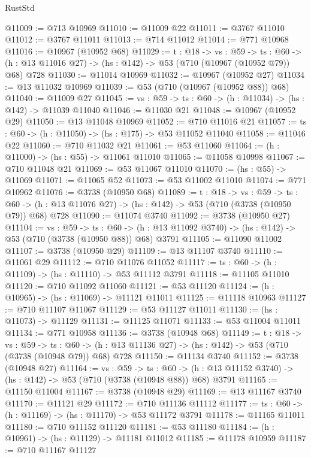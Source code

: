 \begin{lexlean}{RustStd}
\begin{coremodule}
@11009 := @713 @10969
@11010 := @11009 @22
@11011 := @3767 @11010
@11012 := @3767 @11011
@11013 := @714 @11012
@11014 := @771 @10968
@11016 := @10967 (@10952 @68)
@11029 := {t : @18} ->
  {vs : @59} ->
  {ts : @60} -> (h : @13 @11016 @27) -> (hs : @142) -> @53 (@710 (@10967 (@10952 @79)) @68) @728
@11030 := @11014 @10969
@11032 := @10967 (@10952 @27)
@11034 := @13 @11032 @10969
@11039 := @53 (@710 (@10967 (@10952 @88)) @68)
@11040 := @11009 @27
@11045 := {vs : @59} -> {ts : @60} -> (h : @11034) -> (hs : @142) -> @11039 @11040
@11046 := @11030 @21
@11048 := @10967 (@10952 @29)
@11050 := @13 @11048 @10969
@11052 := @710 @11016 @21
@11057 := {ts : @60} -> (h : @11050) -> (hs : @175) -> @53 @11052 @11040
@11058 := @11046 @22
@11060 := @710 @11032 @21
@11061 := @53 @11060
@11064 := (h : @11000) -> (hs : @55) -> @11061 @11010
@11065 := @11058 @10998
@11067 := @710 @11048 @21
@11069 := @53 @11067 @11010
@11070 := (hs : @55) -> @11069
@11071 := @11065 @52
@11073 := @53 @11002 @11010
@11074 := @771 @10962
@11076 := @3738 (@10950 @68)
@11089 := {t : @18} ->
  {vs : @59} ->
  {ts : @60} -> (h : @13 @11076 @27) -> (hs : @142) -> @53 (@710 (@3738 (@10950 @79)) @68) @728
@11090 := @11074 @3740
@11092 := @3738 (@10950 @27)
@11104 := {vs : @59} ->
  {ts : @60} -> (h : @13 @11092 @3740) -> (hs : @142) -> @53 (@710 (@3738 (@10950 @88)) @68) @3791
@11105 := @11090 @11002
@11107 := @3738 (@10950 @29)
@11109 := @13 @11107 @3740
@11110 := @11061 @29
@11112 := @710 @11076 @11052
@11117 := {ts : @60} -> (h : @11109) -> (hs : @11110) -> @53 @11112 @3791
@11118 := @11105 @11010
@11120 := @710 @11092 @11060
@11121 := @53 @11120
@11124 := (h : @10965) -> (hs : @11069) -> @11121 @11011
@11125 := @11118 @10963
@11127 := @710 @11107 @11067
@11129 := @53 @11127 @11011
@11130 := (hs : @11073) -> @11129
@11131 := @11125 @11071
@11133 := @53 @11004 @11011
@11134 := @771 @10958
@11136 := @3738 (@10948 @68)
@11149 := {t : @18} ->
  {vs : @59} ->
  {ts : @60} -> (h : @13 @11136 @27) -> (hs : @142) -> @53 (@710 (@3738 (@10948 @79)) @68) @728
@11150 := @11134 @3740
@11152 := @3738 (@10948 @27)
@11164 := {vs : @59} ->
  {ts : @60} -> (h : @13 @11152 @3740) -> (hs : @142) -> @53 (@710 (@3738 (@10948 @88)) @68) @3791
@11165 := @11150 @11004
@11167 := @3738 (@10948 @29)
@11169 := @13 @11167 @3740
@11170 := @11121 @29
@11172 := @710 @11136 @11112
@11177 := {ts : @60} -> (h : @11169) -> (hs : @11170) -> @53 @11172 @3791
@11178 := @11165 @11011
@11180 := @710 @11152 @11120
@11181 := @53 @11180
@11184 := (h : @10961) -> (hs : @11129) -> @11181 @11012
@11185 := @11178 @10959
@11187 := @710 @11167 @11127

\end{coremodule}
\end{lexlean}
